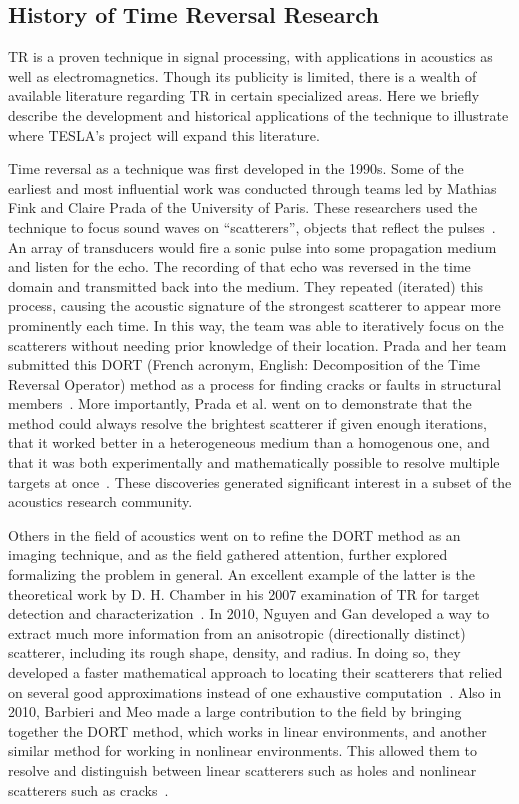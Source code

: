 \subsection{History of Time Reversal Research}

TR is a proven technique in signal processing, with applications in acoustics as well as electromagnetics. Though its publicity is limited, there is a wealth of available literature regarding TR in certain specialized areas. Here we briefly describe the development and historical applications of the technique to illustrate where TESLA's project will expand this literature.

Time reversal as a technique was first developed in the 1990s. Some of the earliest and most influential work was conducted through teams led by Mathias Fink and Claire Prada of the University of Paris. These researchers used the technique to focus sound waves on ``scatterers'', objects that reflect the pulses~\cite{prada_iterative_1991}. An array of transducers would fire a sonic pulse into some propagation medium and listen for the echo. The recording of that echo was reversed in the time domain and transmitted back into the medium. They repeated (iterated) this process, causing the acoustic signature of the strongest scatterer to appear more prominently each time. In this way, the team was able to iteratively focus on the scatterers without needing prior knowledge of their location. Prada and her team submitted this DORT (French acronym, English: Decomposition of the Time Reversal Operator) method as a process for finding cracks or faults in structural members~\cite{prada_iterative_1991}. More importantly, Prada et al. went on to demonstrate that the method could always resolve the brightest scatterer if given enough iterations, that it worked better in a heterogeneous medium than a homogenous one, and that it was both experimentally and mathematically possible to resolve multiple targets at once~\cite{prada_decomposition_1996}. These discoveries generated significant interest in a subset of the acoustics research community.

Others in the field of acoustics went on to refine the DORT method as an imaging technique, and as the field gathered attention, further explored formalizing the problem in general. An excellent example of the latter is the theoretical work by D. H. Chamber in his 2007 examination of TR for target detection and characterization~\cite{chambers_target_2007}. In 2010, Nguyen and Gan developed a way to extract much more information from an anisotropic (directionally distinct) scatterer, including its rough shape, density, and radius. In doing so, they developed a faster mathematical approach to locating their scatterers that relied on several good approximations instead of one exhaustive computation~\cite{nguyen_dort_2010}. Also in 2010, Barbieri and Meo made a large contribution to the field by bringing together the DORT method, which works in linear environments, and another similar method for working in nonlinear environments. This allowed them to resolve and distinguish between linear scatterers such as holes and nonlinear scatterers such as cracks~\cite{barbieri_time_2010}.

